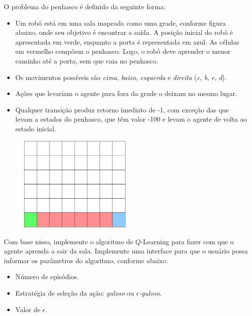 \begin{exercise}
O problema do penhasco é definido da seguinte forma:
\begin{itemize}
	\item Um robô está em uma sala mapeada como uma grade, conforme figura abaixo, onde seu objetivo é encontrar a saída. A posição inicial do robô é apresentada em verde, enquanto a porta é representada em azul. As células em vermelho compõem o penhasco. Logo, o robô deve aprender o menor caminho até a porta, sem que caia no penhasco.
	
	\item Os movimentos possíveis são \textit{cima}, \textit{baixo}, \textit{esquerda} e \textit{direita} (\textit{c}, \textit{b}, \textit{e}, \textit{d}).
	
	\item Ações que levariam o agente para fora da grade o deixam no mesmo lugar.
	
	\item Qualquer transição produz retorno imediato de -1, com exceção das que levam a estados do penhasco, que têm valor -100 e levam o agente de volta ao estado inicial.
\end{itemize}

\begin{figure}
	\centering
	\includegraphics[width=0.5\textwidth]{img/exercicios/problema-penhasco}
\end{figure}

Com base nisso, implemente o algoritmo de $Q$-Learning para fazer com que o agente aprenda a sair da sala. Implemente uma interface para que o usuário possa informar os parâmetros do algoritmo, conforme abaixo:
\begin{itemize}
	\item Número de episódios.
	\item Estratégia de seleção da ação: \textit{guloso} ou \textit{$\epsilon$-guloso}.
	\item Valor de $\epsilon$.
\end{itemize}


\end{exercise}
